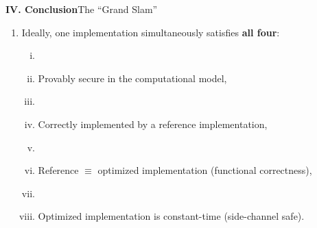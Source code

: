\documentclass[10pt,aspectratio=1610,compress,dvipsnames]{beamer}
\begin{document}
\begin{frame}[fragile]{\bfseries IV. Conclusion}{The ``Grand Slam''}
\begin{description}[style=nextline]
  \item[{\color{cseblue}\bfseries The ``Grand Slam'' of CAC}]
\end{description}
\begin{enumerate}[$\bullet$]
  \item Ideally, one implementation simultaneously satisfies \textbf{all four}:
  \begin{enumerate}[(i)]
  	\item[]
    \item Provably secure in the computational model,
    \item[]
    \item Correctly implemented by a reference implementation,
    \item[]
    \item Reference $\equiv$ optimized implementation (functional correctness),
    \item[]
    \item Optimized implementation is constant-time (side-channel safe).
  \end{enumerate}
\end{enumerate}
\medskip
\end{frame}
\end{document}
